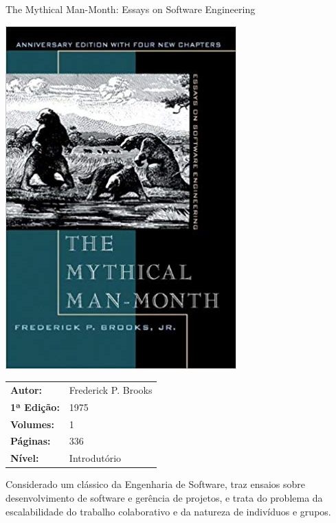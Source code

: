 \begin{frame}[fragile]{The Mythical Man-Month: Essays on Software Engineering}

    \begin{minipage}{0.4\textwidth}
        \includegraphics[scale=0.25]{brooks.jpg}
    \end{minipage}
    \begin{minipage}{0.5\textwidth}
        \begin{small}
            \begin{tabularx}{0.95\textwidth}{lX}
                \textbf{Autor:} & Frederick P. Brooks \\
                \textbf{1ª Edição:} & 1975 \\
                \textbf{Volumes:} & 1 \\
                \textbf{Páginas:} & 336 \\
                \textbf{Nível:} & Introdutório \\
            \end{tabularx}
        \end{small}
    \end{minipage}

    \vspace{0.2in} 

    Considerado um clássico da Engenharia de Software, traz ensaios sobre desenvolvimento de
    software e gerência de projetos, e trata do problema da escalabilidade do trabalho
    colaborativo e da natureza de indivíduos e grupos.
\end{frame}

